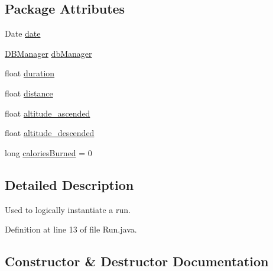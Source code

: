 \subsection*{Package Attributes}
\begin{DoxyCompactItemize}
\item 
Date \hyperlink{classcom_1_1activitytracker_1_1_run_a66934b1f4fe6bc74a4e98574a2892764}{date}
\item 
\hyperlink{classcom_1_1activitytracker_1_1_d_b_manager}{D\+B\+Manager} \hyperlink{classcom_1_1activitytracker_1_1_run_ab90e32eda9f4c671ae3575f971edca6b}{db\+Manager}
\item 
float \hyperlink{classcom_1_1activitytracker_1_1_run_a5e38d293d29d4b65c9290ff4bee82e03}{duration}
\item 
float \hyperlink{classcom_1_1activitytracker_1_1_run_a7b4ca8c4ecea4da1653f03b8c8fc16a8}{distance}
\item 
float \hyperlink{classcom_1_1activitytracker_1_1_run_a247fe29ef5dceeb25750fc7c2701f5c8}{altitude\+\_\+ascended}
\item 
float \hyperlink{classcom_1_1activitytracker_1_1_run_a26cd078680ee374482ce848b90308dda}{altitude\+\_\+descended}
\item 
long \hyperlink{classcom_1_1activitytracker_1_1_run_aa4c73467653a47d3b14ff6653bbab853}{calories\+Burned} = 0
\end{DoxyCompactItemize}


\subsection{Detailed Description}
Used to logically instantiate a run. 

Definition at line 13 of file Run.\+java.



\subsection{Constructor \& Destructor Documentation}
